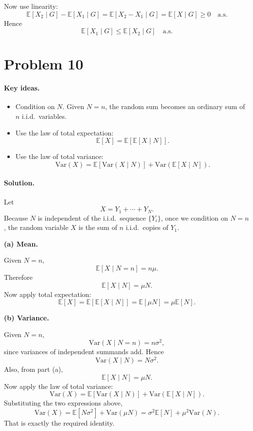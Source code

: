 \documentclass[11pt]{article}
\newcommand{\E}{\mathbb{E}}
\newcommand{\Var}{\mathrm{Var}}
\newcommand{\1}{\mathbf{1}}
\begin{document}
Now use linearity:
\[
    \E[X_2\mid G]-\E[X_1\mid G]
    =
    \E[X_2-X_1\mid G]
    =
    \E[X\mid G]
    \ge 0
    \quad \text{a.s.}
\]
Hence
\[
    \E[X_1\mid G] \le \E[X_2\mid G]
    \quad \text{a.s.}
\]

\section*{Problem 10}
\paragraph{Key ideas.}
\begin{itemize}
    \item Condition on \(N\). Given \(N=n\), the random sum becomes an ordinary sum of \(n\) i.i.d.\ variables.
    \item Use the law of total expectation:
    \[
        \E[X]=\E[\E[X\mid N]].
    \]
    \item Use the law of total variance:
    \[
        \Var(X)=\E[\Var(X\mid N)] + \Var(\E[X\mid N]).
    \]
\end{itemize}

\paragraph{Solution.}
Let
\[
    X = Y_1+\cdots+Y_N.
\]
Because \(N\) is independent of the i.i.d.\ sequence \(\{Y_i\}\), once we condition on \(N=n\), the random variable \(X\) is the sum of \(n\) i.i.d.\ copies of \(Y_1\).

\textbf{(a) Mean.}

Given \(N=n\),
\[
    \E[X\mid N=n] = n\mu.
\]
Therefore
\[
    \E[X\mid N]=\mu N.
\]
Now apply total expectation:
\[
    \E[X] = \E[\E[X\mid N]] = \E[\mu N] = \mu \E[N].
\]

\textbf{(b) Variance.}

Given \(N=n\),
\[
    \Var(X\mid N=n)=n\sigma^2,
\]
since variances of independent summands add. Hence
\[
    \Var(X\mid N)=N\sigma^2.
\]
Also, from part (a),
\[
    \E[X\mid N]=\mu N.
\]
Now apply the law of total variance:
\[
    \Var(X)
    =
    \E[\Var(X\mid N)] + \Var(\E[X\mid N]).
\]
Substituting the two expressions above,
\[
    \Var(X)
    =
    \E[N\sigma^2] + \Var(\mu N)
    =
    \sigma^2 \E[N] + \mu^2 \Var(N).
\]
That is exactly the required identity.
\end{document}
